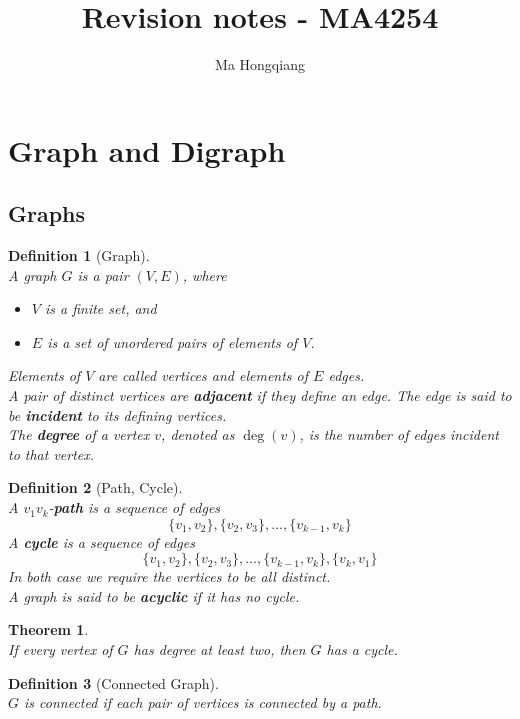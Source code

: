 \documentclass[12pt]{article}
\newtheorem{definition}{Definition}[section]
\newtheorem{theorem}{Theorem}[section]
\theoremstyle{definition}
\begin{document}
\title{Revision notes - MA4254}
\author{Ma Hongqiang}
\maketitle
\tableofcontents

\clearpage
\section{Graph and Digraph}
\subsection{Graphs}
\begin{definition}[Graph]
\hfill\\\normalfont A graph $G$ is a pair $(V,E)$, where
\begin{itemize}
  \item $V$ is a finite set, and
  \item $E$ is a set of unordered pairs of elements of $V$.
\end{itemize}
Elements of $V$ are called vertices and elements of $E$ edges.\\
A pair of distinct vertices are \textbf{adjacent} if they define an edge. The edge is said to be \textbf{incident} to its defining vertices.\\
The \textbf{degree} of a vertex $v$, denoted as $\deg(v)$, is the number of edges incident to that vertex.
\end{definition}
\begin{definition}[Path, Cycle]
\hfill\\\normalfont A $v_1v_k$-\textbf{path} is a sequence of edges
\[
\{v_1, v_2\}, \{v_2, v_3\},\ldots, \{v_{k-1}, v_k\}
\]
A \textbf{cycle} is a sequence of edges
\[
\{v_1, v_2\}, \{v_2, v_3\},\ldots, \{v_{k-1}, v_k\}, \{v_k, v_1\}
\]
In both case we require the vertices to be all \textit{distinct}.\\
A graph is said to be \textbf{acyclic} if it has no cycle.
\end{definition}
\begin{theorem}
\hfill\\\normalfont If every vertex of $G$ has degree at least two, then $G$ has a cycle.
\end{theorem}
\begin{definition}[Connected Graph]
\hfill\\\normalfont $G$ is connected if each pair of vertices is connected by a path.
\end{definition}
\end{document}
